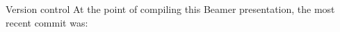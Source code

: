 \begin{frame}{Version control}
	At the point of compiling this Beamer presentation, the most recent commit was:

	\commiturl

\end{frame}
